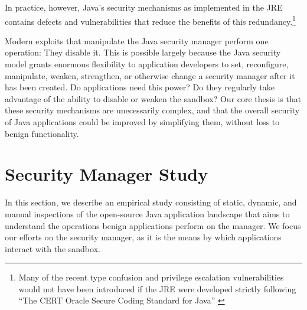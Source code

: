 \documentclass{sig-alternate}
\begin{document}
In practice, however, Java's security mechanisms as implemented
in the JRE contains defects and vulnerabilities that reduce the benefits of
this redundancy.\footnote{Many of the recent type confusion and privilege escalation vulnerabilities
would not have been introduced if the JRE were developed strictly
following ``The CERT Oracle Secure Coding Standard for Java'' \cite{long_cert_2011,svoboda_anatomy_blog_2013,svoboda_anatomy_2014}}
  
Modern exploits that manipulate the Java security manager perform one
operation: They disable it.  This is possible largely because the Java security model
grants enormous flexibility to application developers to
set, reconfigure, manipulate, weaken, strengthen, or otherwise change a security
manager after it has been created.
Do applications need this power?  Do they regularly take advantage of the
ability to disable or weaken the sandbox? %
Our core thesis is that these security mechanisms are unecessarily
complex, and that the overall security of Java applications could be improved by
simplifying them, without loss to benign functionality.

\section{Security Manager Study}\label{sec:Security-Manager-Study}

In this section, we describe an empirical study consisting of static,
dynamic, and manual inspections of the open-source Java application landscape
that aims to understand the operations benign applications perform on the
manager. We focus our efforts on the security manager, as it is the
means by which applications interact with the sandbox.
\end{document}
